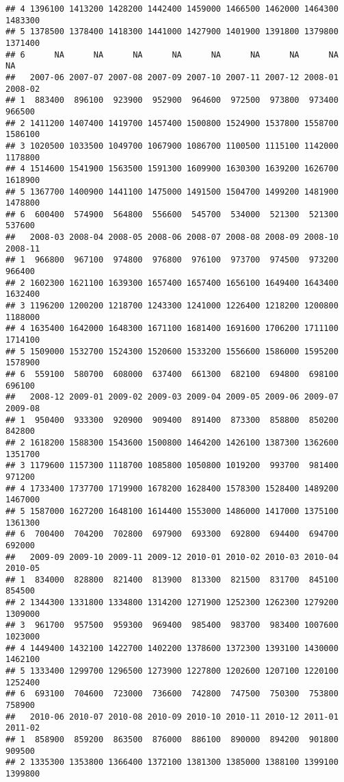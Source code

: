 \documentclass[
]{article}
\begin{document}
\begin{verbatim}
## 4 1396100 1413200 1428200 1442400 1459000 1466500 1462000 1464300 1483300
## 5 1378500 1378400 1418300 1441000 1427900 1401900 1391800 1379800 1371400
## 6      NA      NA      NA      NA      NA      NA      NA      NA      NA
##   2007-06 2007-07 2007-08 2007-09 2007-10 2007-11 2007-12 2008-01 2008-02
## 1  883400  896100  923900  952900  964600  972500  973800  973400  966500
## 2 1411200 1407400 1419700 1457400 1500800 1524900 1537800 1558700 1586100
## 3 1020500 1033500 1049700 1067900 1086700 1100500 1115100 1142000 1178800
## 4 1514600 1541900 1563500 1591300 1609900 1630300 1639200 1626700 1618900
## 5 1367700 1400900 1441100 1475000 1491500 1504700 1499200 1481900 1478800
## 6  600400  574900  564800  556600  545700  534000  521300  521300  537600
##   2008-03 2008-04 2008-05 2008-06 2008-07 2008-08 2008-09 2008-10 2008-11
## 1  966800  967100  974800  976800  976100  973700  974500  973200  966400
## 2 1602300 1621100 1639300 1657400 1657400 1656100 1649400 1643400 1632400
## 3 1196200 1200200 1218700 1243300 1241000 1226400 1218200 1200800 1188000
## 4 1635400 1642000 1648300 1671100 1681400 1691600 1706200 1711100 1714100
## 5 1509000 1532700 1524300 1520600 1533200 1556600 1586000 1595200 1578900
## 6  559100  580700  608000  637400  661300  682100  694800  698100  696100
##   2008-12 2009-01 2009-02 2009-03 2009-04 2009-05 2009-06 2009-07 2009-08
## 1  950400  933300  920900  909400  891400  873300  858800  850200  842800
## 2 1618200 1588300 1543600 1500800 1464200 1426100 1387300 1362600 1351700
## 3 1179600 1157300 1118700 1085800 1050800 1019200  993700  981400  971200
## 4 1733400 1737700 1719900 1678200 1628400 1578300 1528400 1489200 1467000
## 5 1587000 1627200 1648100 1614400 1553000 1486000 1417000 1375100 1361300
## 6  700400  704200  702800  697900  693300  692800  694400  694700  692000
##   2009-09 2009-10 2009-11 2009-12 2010-01 2010-02 2010-03 2010-04 2010-05
## 1  834000  828800  821400  813900  813300  821500  831700  845100  854500
## 2 1344300 1331800 1334800 1314200 1271900 1252300 1262300 1279200 1309000
## 3  961700  957500  959300  969400  985400  983700  983400 1007600 1023000
## 4 1449400 1432100 1422700 1402200 1378600 1372300 1393100 1430000 1462100
## 5 1333400 1299700 1296500 1273900 1227800 1202600 1207100 1220100 1252400
## 6  693100  704600  723000  736600  742800  747500  750300  753800  758900
##   2010-06 2010-07 2010-08 2010-09 2010-10 2010-11 2010-12 2011-01 2011-02
## 1  858900  859200  863500  876000  886100  890000  894200  901800  909500
## 2 1335300 1353800 1366400 1372100 1381300 1385000 1388100 1399100 1399800

\end{verbatim}
\end{document}
